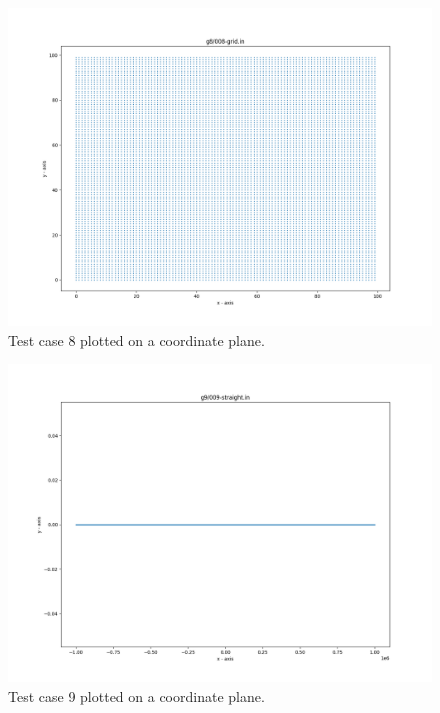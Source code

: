 \documentclass{article}
\begin{document}
\begin{appendices}
\begin{figure}[H]
	\includegraphics[scale=0.5]{code/visualizer/testdata/08.png}
	\caption{Test case 8 plotted on a coordinate plane.}
	\label{fig:08}
\end{figure}
\begin{figure}[H]
	\centering
	\includegraphics[scale=0.5]{code/visualizer/testdata/09.png}
	\caption{Test case 9 plotted on a coordinate plane.}
	\label{fig:09}
\end{figure}
\begin{figure}[H]
	\centering

\end{figure}
\end{appendices}
\end{document}
